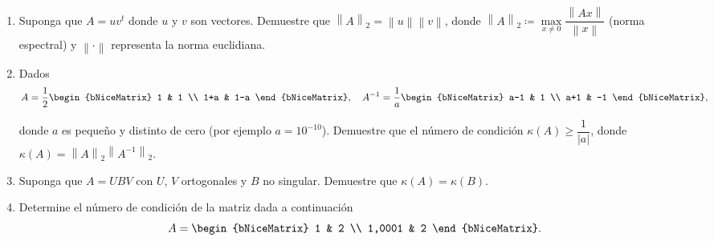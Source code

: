 \documentclass[
	spanish,
	8pt,
	utf8,
	xcolor=table,
	handout,
	aspectratio=169,
	professionalfonts,
	notheorems,
	mathserif,
]{beamer}
\newcounter{savedenum}
\newcommand*{\resume}{\setcounter{enumi}{\thesavedenum}}
\begin{document}
\begin{frame}
	\begin{enumerate}
		\resume

		\item

		      Suponga que $A=uv^{t}$ donde $u$ y $v$ son vectores.
		      Demuestre que
		      \begin{math}
			      {\left\|A\right\|}_{2}=
			      \left\|u\right\|
			      \left\|v\right\|
		      \end{math},
		      donde
		      \begin{math}
			      \left\|A\right\|_{2}\coloneqq
			      \max\limits_{x\neq0}
			      \dfrac{\left\|Ax\right\|}{\left\|x\right\|}
		      \end{math}
		      (norma espectral)
		      y $\left\|\cdot\right\|$ representa la norma euclidiana.


		\item

		      Dados
		      \begin{equation*}
			      A=
			      \frac{1}{2}
			      \begin{bNiceMatrix}
				      1   & 1   \\
				      1+a & 1-a
			      \end{bNiceMatrix},\quad
			      A^{-1}=
			      \frac{1}{a}
			      \begin{bNiceMatrix}
				      a-1 & 1  \\
				      a+1 & -1
			      \end{bNiceMatrix},
		      \end{equation*}

		      donde $a$ es pequeño y distinto de cero
		      (por ejemplo $a=10^{-10}$).
		      Demuestre que el número de condición
		      $\kappa\left(A\right)\geq\dfrac{1}{\left|a\right|}$,
		      donde
		      \begin{math}
			      \kappa\left(A\right)=
			      {\left\|A\right\|}_{2}
			      {\left\|A^{-1}\right\|}_2
		      \end{math}.

		\item

		      Suponga que $A=UBV$ con $U$, $V$ ortogonales y $B$ no singular.
		      Demuestre que $\kappa\left(A\right)=\kappa\left(B\right)$.

		\item

		      Determine el número de condición de la matriz dada a continuación
		      \begin{equation*}
			      A=
			      \begin{bNiceMatrix}
				      1      & 2 \\
				      1,0001 & 2
			      \end{bNiceMatrix}.
		      \end{equation*}


\end{enumerate}
\end{frame}
\end{document}
